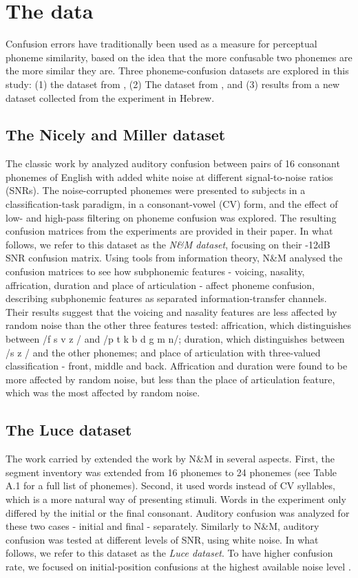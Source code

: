 \section{The data}
Confusion errors have traditionally been used as a measure for perceptual phoneme similarity, based on the idea that the more confusable two phonemes are the more similar they are. Three phoneme-confusion datasets are explored in this study: (1) the dataset from \citet{NicelyMiller1955}, (2) The dataset from \citet{Luce1987}, and (3) results from a new dataset collected from the experiment in Hebrew.

\subsection{The Nicely and Miller dataset} The classic work by \citet{NicelyMiller1955} analyzed auditory confusion between pairs of 16 consonant phonemes of English with added white noise at different signal-to-noise ratios (SNRs). The noise-corrupted phonemes were presented to subjects in a classification-task paradigm, in a consonant-vowel (CV) form, and the effect of low- and high-pass filtering on phoneme confusion was explored. The resulting confusion matrices from the experiments are provided in their paper. In what follows, we refer to this dataset as the \textit{N\&M dataset}, focusing on their -12dB SNR confusion matrix. Using tools from information theory, N\&M analysed the confusion matrices to see how subphonemic features - voicing, nasality, affrication, duration and place of articulation - affect phoneme confusion, describing subphonemic features as separated information-transfer channels. Their results suggest that the voicing and nasality features are less affected by random noise than the other three features tested: affrication, which distinguishes between /f  s  v  z / and /p t k b d g m n/; duration, which distinguishes between /s  z / and the other phonemes; and place of articulation with three-valued classification - front, middle and back. Affrication and duration were found to be more affected by random noise, but less than the place of articulation feature, which was the most affected by random noise. 

\subsection{The Luce dataset} The work carried by \citet{Luce1987} extended the work by N\&M in several aspects. First, the segment inventory was extended from 16 phonemes to 24 phonemes (see Table A.1 for a full list of phonemes). Second, it used words instead of CV syllables, which is a more natural way of presenting stimuli. Words in the experiment only differed by the initial or the final consonant. Auditory confusion was analyzed for these two cases - initial and final - separately. Similarly to N\&M, auditory confusion was tested at different levels of SNR, using white noise. In what follows, we refer to this dataset as the \textit{Luce dataset}. To have higher confusion rate, we focused on initial-position confusions at the highest available noise level \citep{Redford1999}.

